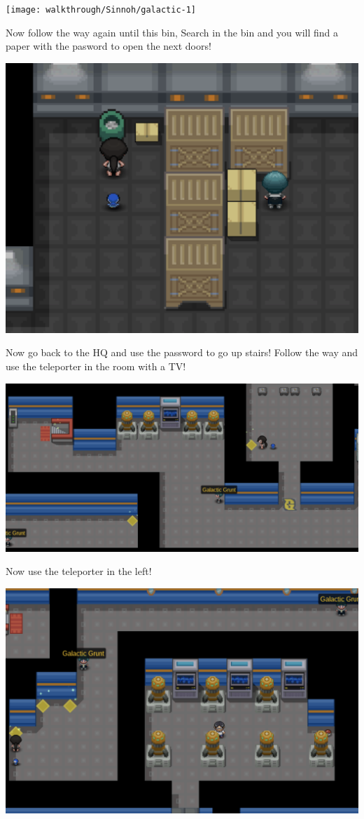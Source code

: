 \documentclass[11pt]{article}
\begin{document}
\texttt{[image: walkthrough/Sinnoh/galactic-1]}

Now follow the way again until this bin, Search in the bin and you will
find a paper with the pasword to open the next doors!

\includegraphics[width=\textwidth]{walkthrough/Sinnoh/galactic-2}

Now go back to the HQ and use the password to go up stairs!
Follow the way and use the teleporter in the room with a TV!

\includegraphics[width=\textwidth]{walkthrough/Sinnoh/galactic-3}

Now use the teleporter in the left!

\includegraphics[width=\textwidth]{walkthrough/Sinnoh/galactic-4}
\end{document}

